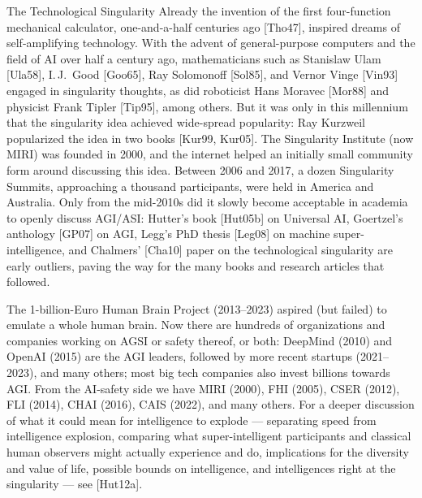 \documentclass[aspectratio=169,10pt]{beamer}
\begin{document}
\begin{frame}[allowframebreaks]{The Technological Singularity}
  Already the invention of the first four-function mechanical calculator,
  one-and-a-half centuries ago [Tho47], inspired dreams of
  self-amplifying technology. With the advent of general-purpose
  computers and the field of AI over half a century ago, mathematicians
  such as Stanislaw Ulam [Ula58], I.\,J.\ Good [Goo65], Ray Solomonoff
  [Sol85], and Vernor Vinge [Vin93] engaged in singularity thoughts, as
  did roboticist Hans Moravec [Mor88] and physicist Frank Tipler [Tip95],
  among others. But it was only in this millennium that the singularity
  idea achieved wide-spread popularity: Ray Kurzweil popularized the idea
  in two books [Kur99, Kur05]. The Singularity Institute (now MIRI) was
  founded in 2000, and the internet helped an initially small community
  form around discussing this idea. Between 2006 and 2017, a dozen
  Singularity Summits, approaching a thousand participants, were held in
  America and Australia. Only from the mid-2010s did it slowly become
  acceptable in academia to openly discuss AGI/ASI: Hutter's book
  [Hut05b] on Universal AI, Goertzel's anthology [GP07] on AGI, Legg's
  PhD thesis [Leg08] on machine super-intelligence, and Chalmers' [Cha10]
  paper on the technological singularity are early outliers, paving the
  way for the many books and research articles that followed.

  \framebreak

  The 1-billion-Euro Human Brain Project (2013--2023) aspired (but
  failed) to emulate a whole human brain. Now there are hundreds of
  organizations and companies working on AGSI or safety thereof, or both:
  DeepMind (2010) and OpenAI (2015) are the AGI leaders, followed by more
  recent startups (2021--2023), and many others; most big tech companies
  also invest billions towards AGI. From the AI-safety side we have MIRI
  (2000), FHI (2005), CSER (2012), FLI (2014), CHAI (2016), CAIS (2022),
  and many others. For a deeper discussion of what it could mean for
  intelligence to explode --- separating speed from intelligence
  explosion, comparing what super-intelligent participants and classical
  human observers might actually experience and do, implications for the
  diversity and value of life, possible bounds on intelligence, and
  intelligences right at the singularity --- see [Hut12a].
\end{frame}
\end{document}
